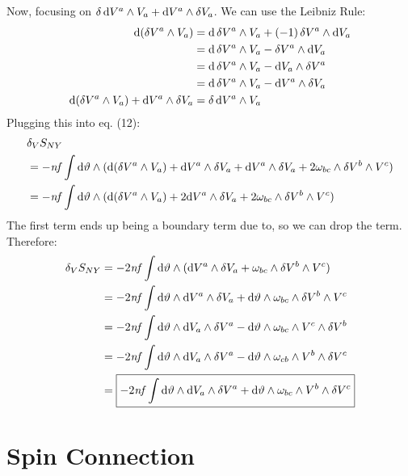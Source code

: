 \documentclass[12pt]{article}
\begin{document}
Now, focusing on $\var{\dd{V^a}} \wedge V_a + \dd V^a \wedge \var{V_a}$. We can use the Leibniz Rule:
\begin{align*}
  \dd(\var{V^a} \wedge V_a) &= \dd{\var{V^a}} \wedge V_a + (-1)\var{V^a} \wedge \dd{V_a} \\
  &= \dd{\var{V^a}} \wedge V_a - \var{V^a} \wedge \dd{V_a} \\
  &= \dd{\var{V^a}} \wedge V_a - \dd{V_a} \wedge \var{V^a} \\
  &= \dd{\var{V^a}} \wedge V_a - \dd{V^a} \wedge \var{V_a} \\
  \dd(\var{V^a} \wedge V_a) + \dd{V^a} \wedge \var{V_a} &= \var{\dd{V^a}} \wedge V_a
\end{align*}
Plugging this into eq. (12):
\begin{align*}
  &\var_V{S_{NY}} \\ &= -\mathit{nf}\int \dd\vartheta \wedge (\dd(\var{V^a} \wedge V_a) + \dd{V^a} \wedge \var{V_a} + \dd V^a \wedge \var{V_a} + 2\omega_{bc} \wedge \var{V^b} \wedge V^c) \\
  &= -\mathit{nf}\int \dd\vartheta \wedge (\dd(\var{V^a} \wedge V_a) + 2\dd V^a \wedge \var{V_a} + 2\omega_{bc} \wedge \var{V^b} \wedge V^c)
\end{align*}
The first term ends up being a boundary term due to, so we can drop the term. Therefore:
\begin{align}
  \var_V{S_{NY}} &= -2\mathit{nf}\int \dd\vartheta \wedge (\dd V^a \wedge \var{V_a} + \omega_{bc} \wedge \var{V^b} \wedge V^c) \nonumber \\
  &= -2\mathit{nf} \int \dd\vartheta \wedge \dd V^a \wedge \var{V_a} + \dd\vartheta \wedge \omega_{bc} \wedge \var{V^b} \wedge V^c \nonumber \\
  &= -2\mathit{nf} \int \dd\vartheta \wedge \dd V_a \wedge \var{V^a} - \dd\vartheta \wedge \omega_{bc} \wedge V^c \wedge \var{V^b} \nonumber \\
  &= -2\mathit{nf} \int \dd\vartheta \wedge \dd V_a \wedge \var{V^a} - \dd\vartheta \wedge \omega_{cb} \wedge V^b \wedge \var{V^c} \nonumber \\
  &= \boxed{-2\mathit{nf} \int \dd\vartheta \wedge \dd V_a \wedge \var{V^a} + \dd\vartheta \wedge \omega_{bc} \wedge V^b \wedge \var{V^c}}
\end{align}

\section{Spin Connection}
\end{document}
